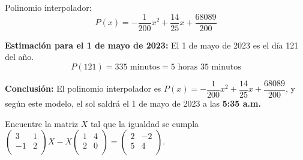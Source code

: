 \begin{prob}
\begin{myproof}
Polinomio interpolador:
\[
P(x) = -\frac{1}{200}x^2 + \frac{14}{25}x + \frac{68089}{200}
\]


\textbf{Estimación para el 1 de mayo de 2023:} El 1 de mayo de 2023 es el día 121 del año.
\[
P(121) = 335 \text{ minutos} = 5 \text{ horas } 35 \text{ minutos}
\]

\textbf{Conclusión:}
El polinomio interpolador es \( P(x) = -\dfrac{1}{200}x^2 + \dfrac{14}{25}x + \dfrac{68089}{200} \), y según este modelo, el sol saldrá el 1 de mayo de 2023 a las \textbf{5:35 a.m.}
\end{myproof}

\end{prob}



\begin{prob}
Encuentre la matriz $X$ tal que la igualdad se cumpla $\left( \begin{array}{cc}
3&1\\
-1&2\\ \end{array} \right) X-X\left( \begin{array}{cc}
1&4\\
2&0\\ \end{array} \right)= \left( \begin{array}{cc}
2&-2\\
5&4\\ \end{array} \right).$
\end{prob}

